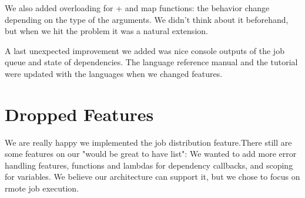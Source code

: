 We also added overloading for + and map functions: the behavior change depending on the type of the arguments.
We didn't think about it beforehand, but when we hit the problem it was a natural extension.

A last unexpected improvement we added was nice console outputs of the job queue and state of dependencies.
The language reference manual and the tutorial were updated with the languages when we changed features.

\section{Dropped Features}

We are really happy we implemented the job distribution feature.There still are some features on our "would be great to have list":
We wanted to add more error handling features, functions and lambdas for dependency callbacks, and scoping for variables.
We believe our architecture can support it, but we chose to focus on rmote job execution.


